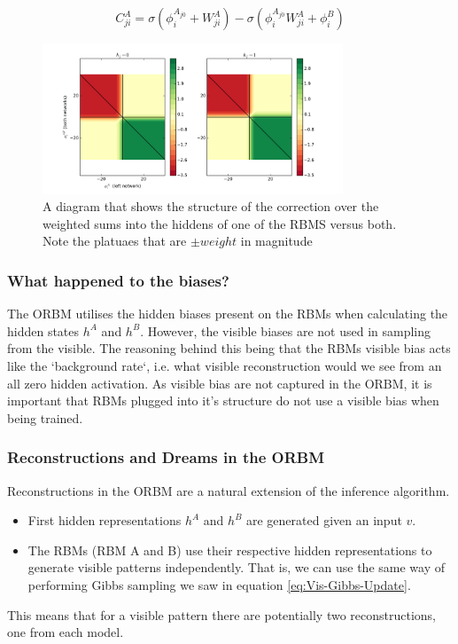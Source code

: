 \begin{equation}\label{eq:Approx-Correction}
 C^A_{ji} = \sigma(\phi^{A_{j0}}_i + W^A_{ji}) - \sigma(\phi^{A_{j0}}_i W^A_{ji} + \phi^B_i)
\end{equation}


\begin{figure}[h]
\begin{center}
  \includegraphics[width = 0.8\textwidth]{Assets/correction.png}
\caption{A diagram that shows the structure of the correction over the weighted sums into the hiddens of one of the RBMS versus both. Note the platuaes that are $\pm weight$ in magnitude}
\label{F:Correction-Plot}
\end{center}
\end{figure}

\subsubsection{What happened to the biases?}

The ORBM utilises the hidden biases present on the RBMs when calculating the hidden states $h^A$ and $h^B$. However, the visible biases are not used in sampling from the visible. The reasoning behind this being that the RBMs visible bias acts like the `background rate`, i.e. what visible reconstruction would we see from an all zero hidden activation. As visible bias are not captured in the ORBM, it is important that RBMs plugged into it's structure do not use a visible bias when being trained.

\subsubsection{Reconstructions and Dreams in the ORBM}

Reconstructions in the ORBM are a natural extension of the inference algorithm.
\begin{itemize}
  \item First hidden representations $h^A$ and $ h^B $ are generated given an input $v$.
  \item The RBMs (RBM A and B) use their respective hidden representations to generate visible patterns independently. That is, we can use the same way of performing Gibbs sampling we saw in equation \ref{eq:Vis-Gibbs-Update}.
\end{itemize}
This means that for a visible pattern there are potentially two reconstructions, one from each model.
